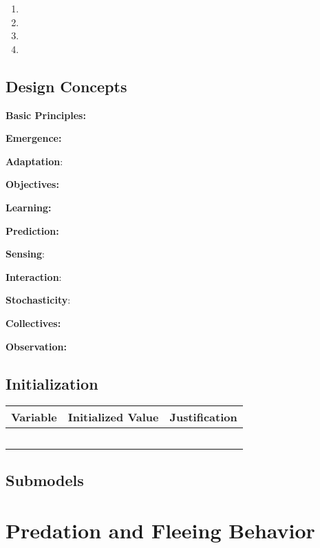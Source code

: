 \documentclass[
]{book}
\providecommand{\tightlist}{%
  \setlength{\itemsep}{0pt}\setlength{\parskip}{0pt}}
\begin{document}
\begin{enumerate}
\def\labelenumi{\arabic{enumi}.}
\tightlist
\item
\item
\item
\item
\end{enumerate}

\section{Design Concepts}\label{design-concepts-8}

\textbf{Basic Principles:}

\textbf{Emergence:}

\textbf{Adaptation}:

\textbf{Objectives:}

\textbf{Learning:}

\textbf{Prediction:}

\textbf{Sensing}:

\textbf{Interaction}:

\textbf{Stochasticity}:

\textbf{Collectives:}

\textbf{Observation:}

\section{Initialization}\label{initialization-8}

\begin{longtable}[]{@{}ccc@{}}
\toprule\noalign{}
Variable & Initialized Value & Justification \\
\midrule\noalign{}
\endhead
\bottomrule\noalign{}
\endlastfoot
& & \\
& & \\
& & \\
& & \\
& & \\
\end{longtable}

\section{Submodels}\label{submodels-8}

\chapter{Predation and Fleeing Behavior}\label{predation-and-fleeing-behavior}
\end{document}

